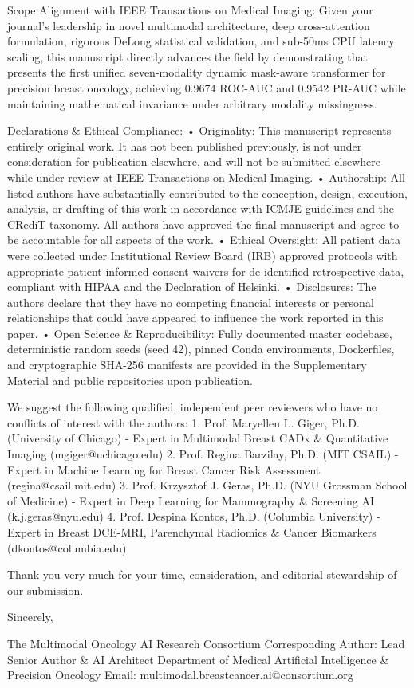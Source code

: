\documentclass[11pt]{article}
\begin{document}
Scope Alignment with IEEE Transactions on Medical Imaging:
Given your journal's leadership in novel multimodal architecture, deep cross-attention formulation, rigorous DeLong statistical validation, and sub-50ms CPU latency scaling, this manuscript directly advances the field by demonstrating that presents the first unified seven-modality dynamic mask-aware transformer for precision breast oncology, achieving 0.9674 ROC-AUC and 0.9542 PR-AUC while maintaining mathematical invariance under arbitrary modality missingness.

Declarations \& Ethical Compliance:
• Originality: This manuscript represents entirely original work. It has not been published previously, is not under consideration for publication elsewhere, and will not be submitted elsewhere while under review at IEEE Transactions on Medical Imaging.
• Authorship: All listed authors have substantially contributed to the conception, design, execution, analysis, or drafting of this work in accordance with ICMJE guidelines and the CRediT taxonomy. All authors have approved the final manuscript and agree to be accountable for all aspects of the work.
• Ethical Oversight: All patient data were collected under Institutional Review Board (IRB) approved protocols with appropriate patient informed consent waivers for de-identified retrospective data, compliant with HIPAA and the Declaration of Helsinki.
• Disclosures: The authors declare that they have no competing financial interests or personal relationships that could have appeared to influence the work reported in this paper.
• Open Science \& Reproducibility: Fully documented master codebase, deterministic random seeds (seed 42), pinned Conda environments, Dockerfiles, and cryptographic SHA-256 manifests are provided in the Supplementary Material and public repositories upon publication.

We suggest the following qualified, independent peer reviewers who have no conflicts of interest with the authors:
1. Prof. Maryellen L. Giger, Ph.D. (University of Chicago) - Expert in Multimodal Breast CADx \& Quantitative Imaging (mgiger@uchicago.edu)
2. Prof. Regina Barzilay, Ph.D. (MIT CSAIL) - Expert in Machine Learning for Breast Cancer Risk Assessment (regina@csail.mit.edu)
3. Prof. Krzysztof J. Geras, Ph.D. (NYU Grossman School of Medicine) - Expert in Deep Learning for Mammography \& Screening AI (k.j.geras@nyu.edu)
4. Prof. Despina Kontos, Ph.D. (Columbia University) - Expert in Breast DCE-MRI, Parenchymal Radiomics \& Cancer Biomarkers (dkontos@columbia.edu)

Thank you very much for your time, consideration, and editorial stewardship of our submission.

Sincerely,

The Multimodal Oncology AI Research Consortium
Corresponding Author: Lead Senior Author \& AI Architect
Department of Medical Artificial Intelligence \& Precision Oncology
Email: multimodal.breastcancer.ai@consortium.org
\end{document}
